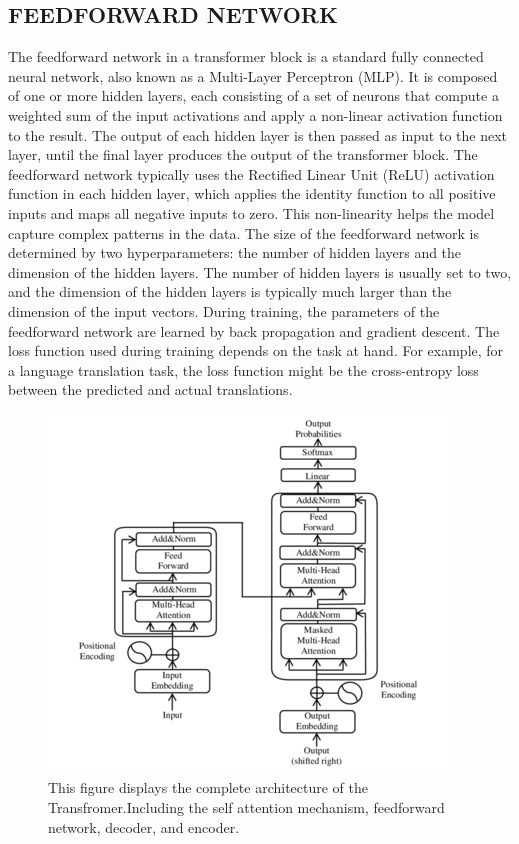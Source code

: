 \documentclass[letterpaper, 10pt, conference]{ieeeconf}
\begin{document}
        \subsection{FEEDFORWARD NETWORK}
        
        The feedforward network in a transformer block is a standard fully connected neural network, also known as a Multi-Layer
        Perceptron (MLP). It is composed of one or more hidden layers, each consisting of a set of neurons that compute a weighted sum
        of the input activations and apply a non-linear activation function to the result. The output of each hidden layer is then passed as
        input to the next layer, until the final layer produces the output of the transformer block\cite{vaswani2017}.
        The feedforward network typically uses the Rectified Linear Unit (ReLU) activation function in each hidden layer, which
        applies the identity function to all positive inputs and maps all negative inputs to zero. This non-linearity helps the model capture
        complex patterns in the data.
        The size of the feedforward network is determined by two hyperparameters: the number of hidden layers and the
        dimension of the hidden layers. The number of hidden layers is usually set to two, and the dimension of the hidden layers is typically
        much larger than the dimension of the input vectors.
        During training, the parameters of the feedforward network are learned by back propagation and gradient descent. The
        loss function used during training depends on the task at hand. For example, for a language translation task, the loss function might
        be the cross-entropy loss between the predicted and actual translations\cite{vaswani2017}.

        \begin{figure}[h]
            \centering
            \includegraphics[scale=0.5]{images/transformer.png}
            \caption{This figure displays the complete architecture of the Transfromer.Including the self attention mechanism, feedforward network, decoder, and encoder\cite{vaswani2017}.}
            \label{}
         \end{figure}
\end{document}
